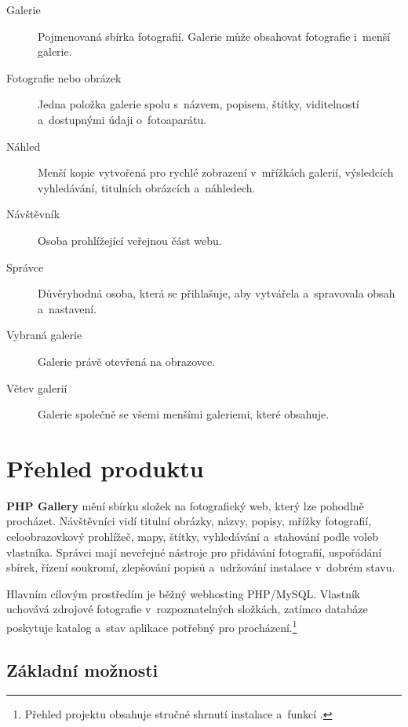 \documentclass[11pt,a4paper]{article}
\newcommand{\product}{\textbf{PHP Gallery}}
\begin{document}
\begin{description}
  \item[Galerie] Pojmenovaná sbírka fotografií. Galerie může obsahovat
  fotografie i~menší galerie.
  \item[Fotografie nebo obrázek] Jedna položka galerie spolu s~názvem, popisem,
  štítky, viditelností a~dostupnými údaji o~fotoaparátu.
  \item[Náhled] Menší kopie vytvořená pro rychlé zobrazení v~mřížkách galerií,
  výsledcích vyhledávání, titulních obrázcích a~náhledech.
  \item[Návštěvník] Osoba prohlížející veřejnou část webu.
  \item[Správce] Důvěryhodná osoba, která se přihlašuje, aby vytvářela
  a~spravovala obsah a~nastavení.
  \item[Vybraná galerie] Galerie právě otevřená na obrazovce.
  \item[Větev galerií] Galerie společně se všemi menšími galeriemi, které
  obsahuje.
\end{description}

\section{Přehled produktu}
\label{sec:overview}

\product{} mění sbírku složek na fotografický web, který lze pohodlně procházet.
Návštěvníci vidí titulní obrázky, názvy, popisy, mřížky fotografií,
celoobrazovkový prohlížeč, mapy, štítky, vyhledávání a~stahování podle voleb
vlastníka. Správci mají neveřejné nástroje pro přidávání fotografií, uspořádání
sbírek, řízení soukromí, zlepšování popisů a~udržování instalace v~dobrém stavu.

Hlavním cílovým prostředím je běžný webhosting PHP/MySQL. Vlastník uchovává
zdrojové fotografie v~rozpoznatelných složkách, zatímco databáze poskytuje
katalog a~stav aplikace potřebný pro procházení.\footnote{Přehled projektu
obsahuje stručné shrnutí instalace a~funkcí \cite{readme}.}

\subsection{Základní možnosti}
\end{document}
